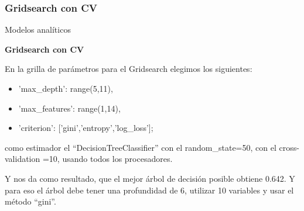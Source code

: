 \documentclass[pdf]{beamer}
\begin{document}
\subsubsection{Gridsearch con CV}

\begin{frame}{Modelos analíticos}

    \begin{Large}
        \textbf{Gridsearch con CV}
    \end{Large}
    \newline
    
    En la grilla de parámetros para el Gridsearch elegimos los siguientes:
    \begin{itemize}
        \item 'max\_depth': range(5,11),
        \item 'max\_features': range(1,14),
        \item 'criterion': ['gini','entropy','log\_loss'];
    \end{itemize}
    como estimador el ``DecisionTreeClassifier'' con el random\_state=50, con el cross-validation =10,  usando todos los procesadores.

    Y nos da como resultado, que el mejor árbol de decisión posible obtiene 0.642. Y para eso el árbol debe tener una profundidad de  6, utilizar  10  variables y usar el método ``gini''.

\end{frame}
\end{document}
